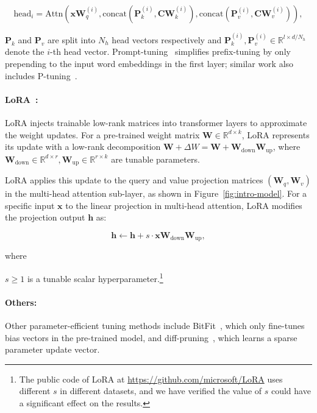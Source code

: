 \begin{equation}
\label{eq:pt}
    \mathrm{head}_i = \mathrm{Attn}({\bm{x}}{\bm{W}}_q^{(i)}, \text{concat}({\bm{P}}_k^{(i)}, {\bm{C}}{\bm{W}}_k^{(i)}), \text{concat}({\bm{P}}_v^{(i)}, {\bm{C}}{\bm{W}}_v^{(i)})), 
\end{equation}

${\bm{P}}_k$ and ${\bm{P}}_v$ are split into $N_h$ head vectors respectively and ${\bm{P}}_k^{(i)}, {\bm{P}}_v^{(i)} \in {\mathbb{R}}^{l\times d/N_h}$ denote the $i$-th head vector. Prompt-tuning~\citep{lester2021power} simplifies prefix-tuning by only prepending to the input word embeddings in the first layer; similar work also includes P-tuning~\citep{liu2021gpt}.

\paragraph{LoRA~\citep{hu2021lora}:} LoRA injects trainable low-rank matrices into transformer layers to approximate the weight updates. For a pre-trained weight matrix ${\bm{W}} \in {\mathbb{R}}^{d\times k}$, LoRA represents its update with a low-rank decomposition ${\bm{W}} + \Delta W = {\bm{W}} + {\bm{W}}_{\text{down}}{\bm{W}}_{\text{up}}$, where ${\bm{W}}_{\text{down}} \in {\mathbb{R}}^{d\times r}, {\bm{W}}_{\text{up}} \in {\mathbb{R}}^{r\times k}$ are tunable parameters.

LoRA applies this update to the query and value projection matrices $({\bm{W}}_q, {\bm{W}}_v)$ in the multi-head attention sub-layer, as shown in Figure~\ref{fig:intro-model}. For a specific input ${\bm{x}}$ to the linear projection in multi-head attention, LoRA modifies the projection output ${\bm{h}}$ as:

\begin{equation}
\label{eq:lora}
    {\bm{h}} \leftarrow {\bm{h}} + s\cdot{\bm{x}}{\bm{W}}_{\text{down}}{\bm{W}}_{\text{up}},
\end{equation}

where 

$s \ge 1$ is a tunable scalar hyperparameter.\footnote{The public code of LoRA at \href{https://github.com/microsoft/LoRA}{https://github.com/microsoft/LoRA} uses different $s$ in different datasets, and we have verified the value of $s$ could have a significant effect on the results.}

\paragraph{Others:} Other parameter-efficient tuning methods include BitFit~\citep{ben2021bitfit}, which only fine-tunes bias vectors in the pre-trained model, and diff-pruning~\citep{guo2020parameter}, which learns a sparse parameter update vector.

